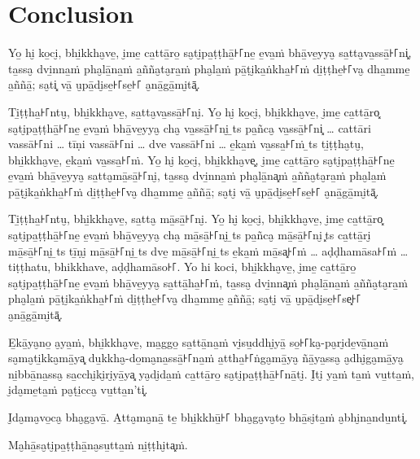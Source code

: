 \paliPage
\chapter*{Conclusion}

Yo̱ hi̮ ko̱ci̮, bhi̱kkha̮ve̱, i̮me̱ ca̱ttā̱ro̱ sa̮ti̮pa̱ṭṭhā̱꜔꜒ne̱ e̱va̱ṁ bhā̱ve̱yya̮ sa̱tta̮va̱ssā̱꜔꜒ni͓,
ta̱ssa̮ dvi̱nna̱ṁ pha̮lā̱na̱ṁ a̱ñña̮ta̮ra̱ṁ pha̮la̱ṁ pā̱ṭi̮ka̱ṅkha̱꜔꜒ṁ di̱ṭṭhe̱꜔꜒va̮ dha̱mme̱ a̱ññā̱; sa̮ti͓
vā̱ u̮pā̱di̮se̱꜔꜒se̱꜔꜒ a̮nā̱gā̱mi̮tā͓.

Ti̱ṭṭha̱꜔꜒ntu̮, bhi̱kkha̮ve̱, sa̱tta̮va̱ssā̱꜔꜒ni̮. Yo̱ hi̮ ko̱ci̮, bhi̱kkha̮ve̱, i̮me̱ ca̱ttā̱ro͓
sa̮ti̮pa̱ṭṭhā̱꜔꜒ne̱ e̱va̱ṁ bhā̱ve̱yya̮ cha̮ va̱ssā̱꜔꜒ni̮ \ldo̱ts{} pa̱ñca̮ va̱ssā̱꜔꜒ni͓
\ldots{} cattāri vassā꜔꜒ni \ldots{} tīṇi vassā꜔꜒ni \ldots{} dve vassā꜔꜒ni \ldots{}
e̱ka̱ṁ va̱ssa̱꜔꜒ṁ \ldo̱ts{} ti̱ṭṭha̮tu̮, bhi̱kkha̮ve̱, e̱ka̱ṁ va̱ssa̱꜔꜒ṁ. Yo̱ hi̮ ko̱ci̮, bhi̱kkha̮ve͓,
i̮me̱ ca̱ttā̱ro̱ sa̮ti̮pa̱ṭṭhā̱꜔꜒ne̱ e̱va̱ṁ bhā̱ve̱yya̮ sa̱tta̮mā̱sā̱꜔꜒ni̮, ta̱ssa̮ dvi̱nna̱ṁ pha̮lā̱na͓ṁ
a̱ñña̮ta̮ra̱ṁ pha̮la̱ṁ pā̱ṭi̮ka̱ṅkha̱꜔꜒ṁ di̱ṭṭhe̱꜔꜒va̮ dha̱mme̱ a̱ññā̱; sa̮ti̮ vā̱ u̮pā̱di̮se̱꜔꜒se̱꜔꜒ a̮nā̱gā̱mi̮tā͓.

Ti̱ṭṭha̱꜔꜒ntu̮, bhi̱kkha̮ve̱, sa̱tta̮ mā̱sā̱꜔꜒ni̮. Yo̱ hi̮ ko̱ci̮, bhi̱kkha̮ve̱, i̮me̱ ca̱ttā̱ro͓
sa̮ti̮pa̱ṭṭhā̱꜔꜒ne̱ e̱va̱ṁ bhā̱ve̱yya̮ cha̮ mā̱sā̱꜔꜒ni̮ \ldo̱ts{} pa̱ñca̮ mā̱sā̱꜔꜒ni̮ \ldo͓ts{}
ca̱ttā̱ri̮ mā̱sā̱꜔꜒ni̮ \ldo̱ts{} tī̱ṇi̮ mā̱sā̱꜔꜒ni̮ \ldo̱ts{} dve̱ mā̱sā̱꜔꜒ni̮ \ldo̱ts{} e̱ka̱ṁ mā̱sa͓꜔꜒ṁ
\ldots{} aḍḍhamāsa꜔꜒ṁ \ldots{} tiṭṭhatu, bhikkhave, aḍḍhamāso꜔꜒. Yo hi koci,
bhi̱kkha̮ve̱, i̮me̱ ca̱ttā̱ro̱ sa̮ti̮pa̱ṭṭhā̱꜔꜒ne̱ e̱va̱ṁ bhā̱ve̱yya̮ sa̱ttā̱ha̱꜔꜒ṁ, ta̱ssa̮ dvi̱nna͓ṁ
pha̮lā̱na̱ṁ a̱ñña̮ta̮ra̱ṁ pha̮la̱ṁ pā̱ṭi̮ka̱ṅkha̱꜔꜒ṁ di̱ṭṭhe̱꜔꜒va̮ dha̱mme̱ a̱ññā̱; sa̮ti̮ vā̱ u̮pā̱di̮se̱꜔꜒se͓꜔꜒
a̮nā̱gā̱mi̮tā͓.

E̱kā̱ya̮no̱ a̮ya̱ṁ, bhi̱kkha̮ve̱, ma̱ggo̱ sa̱ttā̱na̱ṁ vi̮su̱ddhi̮yā̱ so̱꜔꜒ka̮-pa̮ri̮de̱vā̱na̱ṁ sa̮ma̮ti̱kka̮mā̱ya͓
du̱kkha̮-do̱ma̮na̱ssā̱꜔꜒na̱ṁ a̱ttha̱꜔꜒ṅga̮mā̱ya̮ ñā̱ya̱ssa̮ a̮dhi̮ga̮mā̱ya̮ ni̱bbā̱na̱ssa̮ sa̱cchi̮ki̮ri̮yā̱ya͓
ya̮di̮da̱ṁ ca̱ttā̱ro̱ sa̮ti̮pa̱ṭṭhā̱꜔꜒nā̱ti̮. I̮ti̮ ya̱ṁ ta̱ṁ vu̱tta̱ṁ, i̮da̮me̱ta̱ṁ pa̮ṭi̱cca̮ vu̱tta̱n'ti͓.

I̮da̮ma̮vo̱ca̮ bha̮ga̮vā̱. A̱tta̮ma̮nā̱ te̱ bhi̱kkhū̱꜔꜒ bha̮ga̮va̮to̱ bhā̱si̮ta̱ṁ a̮bhi̮na̱ndu̱nti͓.

\bigskip

{\centering\instructionFont\color{instruction}\upshape

  Ma̮hā̱sa̮ti̮pa̱ṭṭhā̱na̮su̱tta̱ṁ ni̱ṭṭhi̮ta͓ṁ.

}

\resumeNormalText
